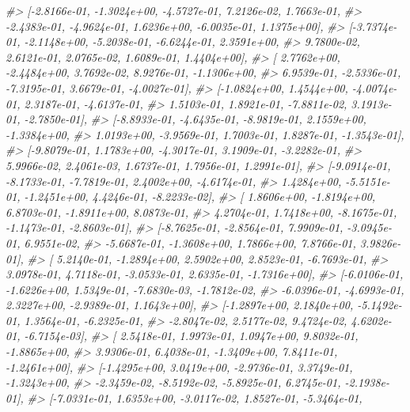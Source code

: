 \documentclass[]{book}
\newenvironment{Shaded}{\begin{snugshade}}{\end{snugshade}}
\newcommand{\CommentTok}[1]{\textcolor[rgb]{0.56,0.35,0.01}{\textit{#1}}}
\begin{document}
\begin{Shaded}
\begin{Highlighting}[]
\CommentTok{#>         [-2.8166e-01, -1.3024e+00, -4.5727e-01,  7.2126e-02,  1.7663e-01,}
\CommentTok{#>          -2.4383e-01, -4.9624e-01,  1.6236e+00, -6.0035e-01,  1.1375e+00],}
\CommentTok{#>         [-3.7374e-01, -2.1148e+00, -5.2038e-01, -6.6244e-01,  2.3591e+00,}
\CommentTok{#>           9.7800e-02,  2.6121e-01,  2.0765e-02,  1.6089e-01,  1.4404e+00],}
\CommentTok{#>         [ 2.7762e+00, -2.4484e+00,  3.7692e-02,  8.9276e-01, -1.1306e+00,}
\CommentTok{#>           6.9539e-01, -2.5336e-01, -7.3195e-01,  3.6679e-01, -4.0027e-01],}
\CommentTok{#>         [-1.0824e+00,  1.4544e+00, -4.0074e-01,  2.3187e-01, -4.6137e-01,}
\CommentTok{#>           1.5103e-01,  1.8921e-01, -7.8811e-02,  3.1913e-01, -2.7850e-01],}
\CommentTok{#>         [-8.8933e-01, -4.6435e-01, -8.9819e-01,  2.1559e+00, -1.3384e+00,}
\CommentTok{#>           1.0193e+00, -3.9569e-01,  1.7003e-01,  1.8287e-01, -1.3543e-01],}
\CommentTok{#>         [-9.8079e-01,  1.1783e+00, -4.3017e-01,  3.1909e-01, -3.2282e-01,}
\CommentTok{#>           5.9966e-02,  2.4061e-03,  1.6737e-01,  1.7956e-01,  1.2991e-01],}
\CommentTok{#>         [-9.0914e-01, -8.1733e-01, -7.7819e-01,  2.4002e+00, -4.6174e-01,}
\CommentTok{#>           1.4284e+00, -5.5151e-01, -1.2451e+00,  4.4246e-01, -8.2233e-02],}
\CommentTok{#>         [ 1.8606e+00, -1.8194e+00,  6.8703e-01, -1.8911e+00,  8.0873e-01,}
\CommentTok{#>           4.2704e-01,  1.7418e+00, -8.1675e-01, -1.1473e-01, -2.8603e-01],}
\CommentTok{#>         [-8.7625e-01, -2.8564e-01,  7.9909e-01, -3.0945e-01,  6.9551e-02,}
\CommentTok{#>          -5.6687e-01, -1.3608e+00,  1.7866e+00,  7.8766e-01,  3.9826e-01],}
\CommentTok{#>         [ 5.2140e-01, -1.2894e+00,  2.5902e+00,  2.8523e-01, -6.7693e-01,}
\CommentTok{#>           3.0978e-01,  4.7118e-01, -3.0533e-01,  2.6335e-01, -1.7316e+00],}
\CommentTok{#>         [-6.0106e-01, -1.6226e+00,  1.5349e-01, -7.6830e-03, -1.7812e-02,}
\CommentTok{#>          -6.0396e-01, -4.6993e-01,  2.3227e+00, -2.9389e-01,  1.1643e+00],}
\CommentTok{#>         [-1.2897e+00,  2.1840e+00, -5.1492e-01,  1.3564e-01, -6.2325e-01,}
\CommentTok{#>          -2.8047e-02,  2.5177e-02,  9.4724e-02,  4.6202e-01, -6.7154e-03],}
\CommentTok{#>         [ 2.5418e-01,  1.9973e-01,  1.0947e+00,  9.8032e-01, -1.8865e+00,}
\CommentTok{#>           3.9306e-01,  6.4038e-01, -1.3409e+00,  7.8411e-01, -1.2461e+00],}
\CommentTok{#>         [-1.4295e+00,  3.0419e+00, -2.9736e-01,  3.3749e-01, -1.3243e+00,}
\CommentTok{#>          -2.3459e-02, -8.5192e-02, -5.8925e-01,  6.2745e-01, -2.1938e-01],}
\CommentTok{#>         [-7.0331e-01,  1.6353e+00, -3.0117e-02,  1.8527e-01, -5.3464e-01,}

\end{Highlighting}
\end{Shaded}
\end{document}
